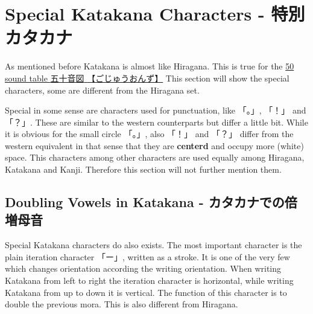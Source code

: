 \section{Special Katakana Characters - 特別カタカナ}\label{sec:SpecialKatakanaCharacters}

As mentioned before Katakana is almost like Hiragana. This is true for the
\hyperref[sec:50SoundTable]{50 sound table  {五十音図} {【ごじゅうおんず】}}
This section will show the special characters, some are different from the
Hiragana set.

Special in some sense are characters used for punctuation, like {「。」},
{「！」} and {「？」}.  These are similar to the western counterparts but
differ a little bit. While it is obvious for the small circle {「。」}, also
{「！」} and {「？」} differ from the western equivalent in that sense that
they are \textbf{centerd} and occupy more (white) space. This characters among
other characters are used equally among Hiragana, Katakana and Kanji. Therefore
this section will not further mention them.


\subsection{Doubling Vowels in Katakana - カタカナでの倍増母音}



Special Katakana characters do also exists. The most important character is
the plain iteration character {「ー」}, written as a stroke. It is one of the
very few which changes orientation according the writing orientation. When
writing Katakana from left to right the iteration character is horizontal,
while writing Katakana from up to down it is vertical. The function of
this character is to double the previous mora. This is also different
from Hiragana.

\bigskip


\bigskip


